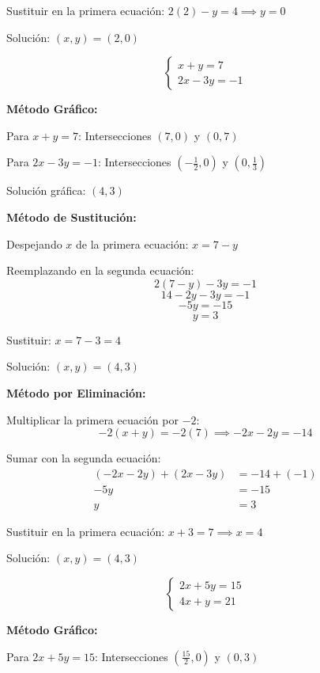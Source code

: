 \begin{exercise}
\begin{solucion}
Sustituir en la primera ecuación: $2(2) - y = 4 \implies y = 0$

Solución: $(x,y) = (2,0)$
\end{solucion}

\problem $$\begin{cases}x + y = 7 \\ 2x - 3y = -1\end{cases}$$

\begin{solucion}
\textbf{Método Gráfico:}

Para $x + y = 7$: Intersecciones $(7, 0)$ y $(0, 7)$

Para $2x - 3y = -1$: Intersecciones $(-\frac{1}{2}, 0)$ y $(0, \frac{1}{3})$

Solución gráfica: $(4, 3)$

\vspace{0.3cm}

\textbf{Método de Sustitución:}

Despejando $x$ de la primera ecuación: $x = 7 - y$

Reemplazando en la segunda ecuación:
$$2(7 - y) - 3y = -1$$
$$14 - 2y - 3y = -1$$
$$-5y = -15$$
$$y = 3$$

Sustituir: $x = 7 - 3 = 4$

Solución: $(x,y) = (4,3)$

\vspace{0.3cm}

\textbf{Método por Eliminación:}

Multiplicar la primera ecuación por $-2$:
$$-2(x + y) = -2(7) \implies -2x - 2y = -14$$

Sumar con la segunda ecuación:
$$\begin{aligned}
(-2x - 2y) + (2x - 3y) &= -14 + (-1) \\
-5y &= -15 \\
y &= 3
\end{aligned}$$

Sustituir en la primera ecuación: $x + 3 = 7 \implies x = 4$

Solución: $(x,y) = (4,3)$
\end{solucion}

\problem $$\begin{cases}2x + 5y = 15 \\ 4x + y = 21\end{cases}$$

\begin{solucion}
\textbf{Método Gráfico:}

Para $2x + 5y = 15$: Intersecciones $(\frac{15}{2}, 0)$ y $(0, 3)$


\end{solucion}
\end{exercise}
